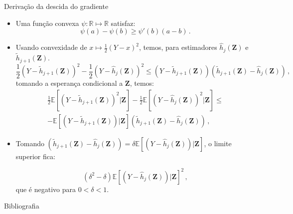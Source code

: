 \documentclass[11pt]{beamer}
\begin{document}
	\appendix
	
	\begin{frame}{Derivação da descida do gradiente}
		\label{grad_desc}
		\begin{itemize}
			\item Uma função convexa $\psi:\mathbb{R}\mapsto \mathbb{R}$ satisfaz:
			$$\psi(a)-\psi(b)\geq \psi'(b)(a-b)\, .$$
			\item Usando convexidade de $x \mapsto \frac{1}{2}(Y-x)^2$, temos, para estimadores $\hat{h}_j(\boldsymbol{Z})$ e $\tilde{h}_{j+1}(\boldsymbol{Z})$.
			$$\frac{1}{2} (Y- \tilde{h}_{j+1}(\boldsymbol{Z}))^2 - \frac{1}{2}(Y- \hat{h}_{j}(\boldsymbol{Z}))^2 \leq (Y- \tilde{h}_{j+1}(\boldsymbol{Z}))(\tilde{h}_{j+1}(\boldsymbol{Z}) - \hat{h}_{j}(\boldsymbol{Z}))\, ,   $$
			tomando a esperança condicional a $\boldsymbol{Z}$, temos:
			\begin{equation*}
				\begin{aligned}
							\frac{1}{2} \mathbb{E}[(Y- \tilde{h}_{j+1}(\boldsymbol{Z}))^2|\boldsymbol{Z}] - \frac{1}{2}\mathbb{E}[(Y- \hat{h}_{j}(\boldsymbol{Z}))^2|\boldsymbol{Z}] \leq \\ 
							-\mathbb{E}[(Y- \tilde{h}_{j+1}(\boldsymbol{Z}))|\boldsymbol{Z}](\tilde{h}_{j+1}(\boldsymbol{Z}) - \hat{h}_{j}(\boldsymbol{Z}))\, , 
				\end{aligned}
			\end{equation*}
			\item Tomando $ (\tilde{h}_{j+1}(\boldsymbol{Z}) - \hat{h}_{j}(\boldsymbol{Z})) = \delta \mathbb{E}[(Y- \hat{h}_{j}(\boldsymbol{Z}))|\boldsymbol{Z}]$, o limite superior fica:
			
			$$(\delta^2 -\delta )\mathbb{E}[(Y- \hat{h}_{j}(\boldsymbol{Z}))|\boldsymbol{Z}]^2 \, ,$$
			que é negativo para $0 < \delta < 1$.	\hyperlink{boosting}{}
		
		\end{itemize}
	\end{frame}
		\begin{frame}[allowframebreaks]{Bibliografia}
	\printbibliography

	\end{frame}
\end{document}
